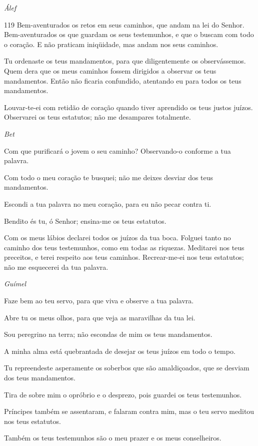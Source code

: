 \bigskip

\centerline{\emph{Álef}}
\lettrine{119}{} Bem-aventurados os
retos em seus caminhos, que andam na lei do Senhor.
Bem-aventurados os que guardam os seus testemunhos, e que o
buscam com todo o coração. E não praticam iniqüidade, mas andam
nos seus caminhos.

Tu ordenaste os teus mandamentos, para que diligentemente os
observássemos. Quem dera que os meus caminhos fossem dirigidos a
observar os teus mandamentos. Então não ficaria confundido,
atentando eu para todos os teus mandamentos.

Louvar-te-ei com retidão de coração quando tiver aprendido os teus
justos juízos. Observarei os teus estatutos; não me desampares
totalmente.

\bigskip
\centerline{\emph{Bet}}

Com que purificará o jovem o seu caminho? Observando-o conforme a
tua palavra.

Com todo o meu coração te busquei; não me deixes desviar dos teus
mandamentos.

Escondi a tua palavra no meu coração, para eu não pecar contra
ti.

Bendito és tu, ó Senhor; ensina-me os teus estatutos.

Com os meus lábios declarei todos os juízos da tua boca.
Folguei tanto no caminho dos teus testemunhos, como em todas
as riquezas. Meditarei nos teus preceitos, e terei respeito
aos teus caminhos. Recrear-me-ei nos teus estatutos; não me
esquecerei da tua palavra.

\bigskip
\centerline{\emph{Guímel}}

Faze bem ao teu servo, para que viva e observe a tua palavra.

Abre tu os meus olhos, para que veja as maravilhas da tua lei.

Sou peregrino na terra; não escondas de mim os teus mandamentos.

A minha alma está quebrantada de desejar os teus juízos em todo o
tempo.

Tu repreendeste asperamente os soberbos que são amaldiçoados, que
se desviam dos teus mandamentos.

Tira de sobre mim o opróbrio e o desprezo, pois guardei os teus
testemunhos.

Príncipes também se assentaram, e falaram contra mim, mas o teu
servo meditou nos teus estatutos.

Também os teus testemunhos são o meu prazer e os meus
conselheiros.

